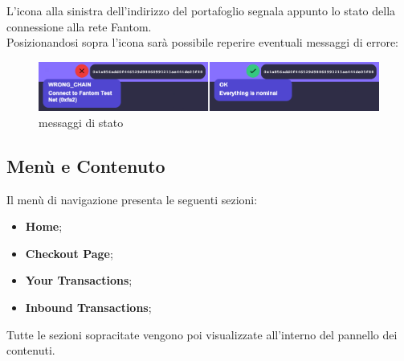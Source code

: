     L'icona alla sinistra dell'indirizzo del portafoglio segnala appunto lo stato della connessione alla rete Fantom\glo{}.\\
    Posizionandosi sopra l'icona sarà possibile reperire eventuali messaggi di errore:
    \begin{figure}[H]
        \centering
        \includegraphics[scale=0.4]{immagini/stateSignal.png}
        \caption{messaggi di stato}
    \end{figure}

    \subsection{Menù e Contenuto}
    Il menù di navigazione presenta le seguenti sezioni:
    \begin{itemize}
        \item \textbf{Home};
        \item \textbf{Checkout Page};
        \item \textbf{Your Transactions};
        \item \textbf{Inbound Transactions};
    \end{itemize}

    Tutte le sezioni sopracitate vengono poi visualizzate all'interno del pannello dei contenuti.

    
